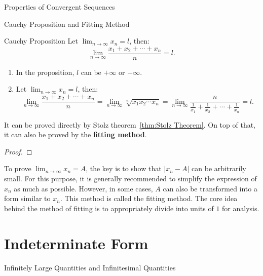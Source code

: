 \documentclass[11pt]{../../TexTemplate/elegantbook}
\begin{document}
\begin{leftbarTitle}{Properties of Convergent Sequences}\end{leftbarTitle}



\begin{leftbarTitle}{Cauchy Proposition and Fitting Method}\end{leftbarTitle}
\begin{proposition}{Cauchy Proposition}\label{prop:Cauchy Proposition}
    Let \(\lim_{n \to \infty} x_n = l\), then:
    \[
        \lim_{n \to \infty} \frac{x_{1}+x_{2}+ \cdots +x_{n}}{n} = l.
    \]
\end{proposition}

\begin{note}
    \begin{enumerate}
        \item In the proposition, \(l\) can be \(+\infty\) or \(-\infty\).
        \item Let \(\lim_{n \to \infty} x_n = l\), then:
            \[
                \lim_{n \to \infty}\frac{x_{1}+x_{2}+ \cdots +x_{n}}{n}
                =\lim_{n \to \infty} \sqrt[n]{x_{1} x_{2} \cdots x_{n}} 
                =\lim_{n \to \infty} \frac{n}{\frac{1}{x_{1}} + \frac{1}{x_{2}} + \cdots + \frac{1}{x_{n}}}
                = l.
            \]
    \end{enumerate}
\end{note}

It can be proved directly by Stolz theorem~\ref{thm:Stolz Theorem}.
On top of that, it can also be proved by the \textbf{fitting method}.

\begin{proof}
    
\end{proof}

\begin{remark}
    To prove \(\lim_{n \to \infty} x_n = A\), 
    the key is to show that \(|x_n - A|\) can be arbitrarily small. 
    For this purpose, it is generally recommended to simplify the expression of \(x_n\) as much as possible. 
    However, in some cases, \(A\) can also be transformed into a form similar to \(x_n\). 
    This method is called the fitting method. 
    The core idea behind the method of fitting is to appropriately divide into units of \(1\) for analysis.
\end{remark}



\section{Indeterminate Form}
\begin{leftbarTitle}{Infinitely Large Quantities and Infinitesimal Quantities}\end{leftbarTitle}
\end{document}
